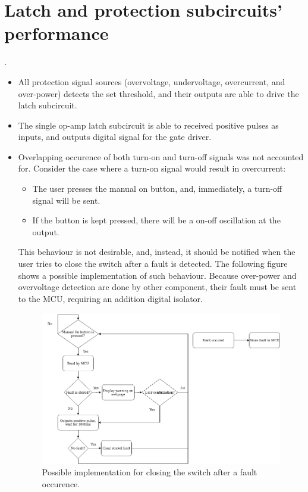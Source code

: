 \documentclass[../main.tex]{subfiles}
\begin{document}
    \pagebreak
    \section{Latch and protection subcircuits' performance} \label{sec:result_latch_circuit}.
    \justify
    \begin{itemize}
        \item All protection signal sources (overvoltage, undervoltage, overcurrent, and over-power) detects the set threshold, and their outputs are able to drive the latch subcircuit.
        \item The single op-amp latch subcircuit is able to received positive pulses as inputs, and outputs digital signal for the gate driver.
        \item Overlapping occurence of both turn-on and turn-off signals was not accounted for. Consider the case where a turn-on signal would result in overcurrent:
        \begin{itemize}
            \item The user presses the manual on button, and, immediately, a turn-off signal will be sent. 
            \item If the button is kept pressed, there will be a on-off oscillation at the output.
        \end{itemize}
        This behaviour is not desirable, and, instead, it should be notified when the user tries to close the switch after a fault is detected. The following figure shows a possible implementation of such behaviour. Because over-power and overvoltage detection are done by other component, their fault must be sent to the MCU, requiring an addition digital isolator.

        \begin{figure}[!h]
            \centerline{\includegraphics[scale=0.5]{media/turn_on_warning.drawio.png}}
            \caption{Possible implementation for closing the switch after a fault occurence.}
            \label{fig:turn_on_warning}
        \end{figure}

    \end{itemize}
\end{document}
